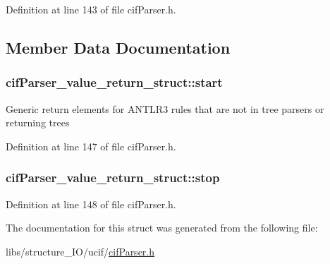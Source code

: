 Definition at line 143 of file cif\-Parser.\-h.



\subsection{Member Data Documentation}
\hypertarget{structcif_parser__value__return__struct_a40639b0c1d49ac7379d453f4d1a61f06}{
\subsubsection[{start}]{ cif\-Parser\-\_\-value\-\_\-return\-\_\-struct\-::start}}\label{structcif_parser__value__return__struct_a40639b0c1d49ac7379d453f4d1a61f06}
Generic return elements for A\-N\-T\-L\-R3 rules that are not in tree parsers or returning trees 

Definition at line 147 of file cif\-Parser.\-h.

\hypertarget{structcif_parser__value__return__struct_a8c63d51e85f35e3652a4720af8a56240}{
\subsubsection[{stop}]{ cif\-Parser\-\_\-value\-\_\-return\-\_\-struct\-::stop}}\label{structcif_parser__value__return__struct_a8c63d51e85f35e3652a4720af8a56240}


Definition at line 148 of file cif\-Parser.\-h.



The documentation for this struct was generated from the following file\-:\begin{DoxyCompactItemize}
\item 
libs/structure\-\_\-\-I\-O/ucif/\hyperlink{cif_parser_8h}{cif\-Parser.\-h}\end{DoxyCompactItemize}
